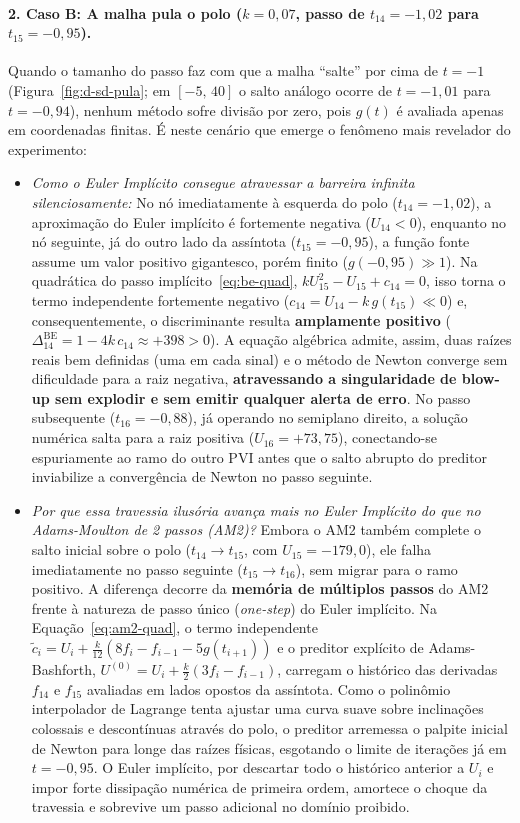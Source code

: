 \documentclass[12pt, a4paper]{article}
\begin{document}
\paragraph{2. Caso B: A malha pula o polo ($k = 0{,}07$, passo de $t_{14} = -1{,}02$ para $t_{15} = -0{,}95$).}
Quando o tamanho do passo faz com que a malha ``salte'' por cima de $t = -1$ (Figura~\ref{fig:d-sd-pula}; em $[-5,\, 40]$ o salto análogo ocorre de $t = -1{,}01$ para $t = -0{,}94$), nenhum método sofre divisão por zero, pois $g(t)$ é avaliada apenas em coordenadas finitas. É neste cenário que emerge o fenômeno mais revelador do experimento:
\begin{itemize}
    \item \emph{Como o Euler Implícito consegue atravessar a barreira infinita silenciosamente:} No nó imediatamente à esquerda do polo ($t_{14} = -1{,}02$), a aproximação do Euler implícito é fortemente negativa ($U_{14} < 0$), enquanto no nó seguinte, já do outro lado da assíntota ($t_{15} = -0{,}95$), a função fonte assume um valor positivo gigantesco, porém finito ($g(-0{,}95) \gg 1$). Na quadrática do passo implícito~\eqref{eq:be-quad}, $k U_{15}^2 - U_{15} + c_{14} = 0$, isso torna o termo independente fortemente negativo ($c_{14} = U_{14} - k\,g(t_{15}) \ll 0$) e, consequentemente, o discriminante resulta \textbf{amplamente positivo} ($\Delta_{14}^{\text{BE}} = 1 - 4k\,c_{14} \approx +398 > 0$). A equação algébrica admite, assim, duas raízes reais bem definidas (uma em cada sinal) e o método de Newton converge sem dificuldade para a raiz negativa, \textbf{atravessando a singularidade de blow-up sem explodir e sem emitir qualquer alerta de erro}. No passo subsequente ($t_{16} = -0{,}88$), já operando no semiplano direito, a solução numérica salta para a raiz positiva ($U_{16} = +73{,}75$), conectando-se espuriamente ao ramo do outro PVI antes que o salto abrupto do preditor inviabilize a convergência de Newton no passo seguinte.

    \item \emph{Por que essa travessia ilusória avança mais no Euler Implícito do que no Adams-Moulton de 2 passos (AM2)?} Embora o AM2 também complete o salto inicial sobre o polo ($t_{14} \to t_{15}$, com $U_{15} = -179{,}0$), ele falha imediatamente no passo seguinte ($t_{15} \to t_{16}$), sem migrar para o ramo positivo. A diferença decorre da \textbf{memória de múltiplos passos} do AM2 frente à natureza de passo único (\emph{one-step}) do Euler implícito. Na Equação~\eqref{eq:am2-quad}, o termo independente $\tilde{c}_i = U_i + \frac{k}{12}(8f_i - f_{i-1} - 5g(t_{i+1}))$ e o preditor explícito de Adams-Bashforth, $U^{(0)} = U_i + \frac{k}{2}(3f_i - f_{i-1})$, carregam o histórico das derivadas $f_{14}$ e $f_{15}$ avaliadas em lados opostos da assíntota. Como o polinômio interpolador de Lagrange tenta ajustar uma curva suave sobre inclinações colossais e descontínuas através do polo, o preditor arremessa o palpite inicial de Newton para longe das raízes físicas, esgotando o limite de iterações já em $t = -0{,}95$. O Euler implícito, por descartar todo o histórico anterior a $U_i$ e impor forte dissipação numérica de primeira ordem, amortece o choque da travessia e sobrevive um passo adicional no domínio proibido.
\end{itemize}
\end{document}
